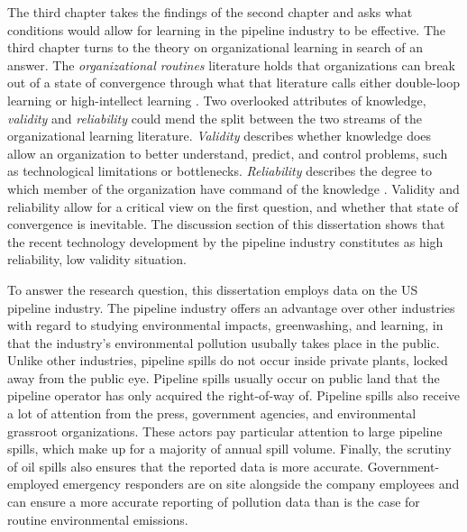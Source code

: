 The third chapter takes the findings of the second chapter and asks what conditions would allow for learning in the pipeline industry to be effective. The third chapter turns to the theory on organizational learning in search of an answer. The \textit{organizational routines} literature holds that organizations can break out of a state of convergence through what that literature calls either double-loop learning \citep{Argyris1978} or high-intellect learning \citep{March2010}. Two overlooked attributes of knowledge, \textit{validity} and \textit{reliability} could mend the split between the two streams of the organizational learning literature. \textit{Validity} describes whether knowledge does allow an organization to better understand, predict, and control problems, such as technological limitations or bottlenecks. \textit{Reliability} describes the degree to which member of the organization have command of the knowledge \citep{Rerup2020}. Validity and reliability allow for a critical view on the first question, and whether that state of convergence is inevitable. The discussion section of this dissertation shows that the recent technology development by the pipeline industry constitutes as high reliability, low validity situation.

To answer the research question, this dissertation employs data on the US pipeline industry. The pipeline industry offers an advantage over other industries with regard to studying environmental impacts, greenwashing, and learning, in that the industry's environmental pollution usubally takes place in the public. Unlike other industries, pipeline spills do not occur inside private plants, locked away from the public eye. Pipeline spills usually occur on public land that the pipeline operator has only acquired the right-of-way of. Pipeline spills also receive a lot of attention from the press, government agencies, and environmental grassroot organizations. These actors pay particular attention to large pipeline spills, which make up for a majority of annual spill volume. Finally, the scrutiny of oil spills also ensures that the reported data is more accurate. Government-employed emergency responders are on site alongside the company employees and can ensure a more accurate reporting of pollution data than is the case for routine environmental emissions.

